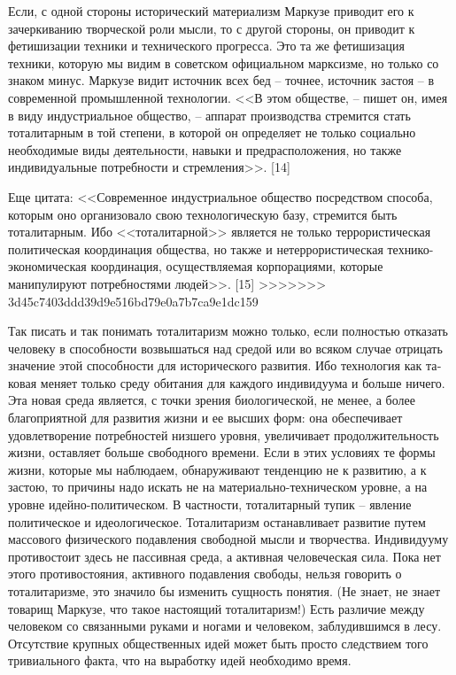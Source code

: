\documentclass{book}
\begin{document}
{Если, с одной стороны исторический материализм Маркузе приводит его к зачеркиванию творческой роли мысли, то с дру­гой стороны, он приводит к фетишизации техники и техниче­ского прогресса. Это та же фетишизация техники, которую мы видим в советском официальном марксизме, но только со знаком минус. Маркузе видит источник всех бед -- точнее, источник застоя -- в современной промышленной технологии. <<В этом обществе, -- пишет он, имея в виду индустриальное общество, -- аппарат производства стремится стать тоталитар­ным в той степени, в которой он определяет не только соци­ально необходимые виды деятельности, навыки и предрасполо­жения, но также индивидуальные потребности и стремления>>. [14]

Еще цитата: <<Современное индустриальное общество посред­ством способа, которым оно организовало свою технологиче­скую базу, стремится быть тоталитарным. Ибо <<тоталитарной>> является не только террористическая политическая коорди­нация общества, но также и нетеррористическая технико-эко­номическая координация, осуществляемая корпорациями, кото­рые манипулируют потребностями людей>>. [15]
>>>>>>> 3d45c7403ddd39d9e516bd79e0a7b7ca9e1dc159

Так писать и так понимать тоталитаризм можно только, ес­ли полностью отказать человеку в способности возвышаться над средой или во всяком случае отрицать значение этой спо­собности для исторического развития. Ибо технология как та­ковая меняет только среду обитания  для каждого индивиду­ума и больше ничего. Эта новая среда является, с точки зрения биологической, не менее, а более благоприятной для развития жизни и ее высших форм: она обеспечивает удовлетворение потребностей низшего уровня, увеличивает продолжительность жизни, оставляет больше свободного времени. Если в этих ус­ловиях те формы жизни, которые мы наблюдаем, обнаружи­вают тенденцию не к развитию, а к застою, то причины надо ис­кать не на материально-техническом уровне, а на уровне идей­но-политическом. В частности, тоталитарный тупик -- явление политическое и идеологическое. Тоталитаризм останавливает развитие путем массового физического подавления свободной мысли и творчества. Индивидууму противостоит здесь не пассив­ная среда, а активная 
человеческая сила. Пока нет этого проти­востояния, активного подавления свободы, нельзя говорить о тоталитаризме, это значило бы изменить сущность понятия. (Не знает, не знает товарищ Маркузе, что такое настоящий то­талитаризм!) Есть различие между человеком со связанными руками и ногами и человеком, заблудившимся в лесу. Отсутст­вие крупных общественных идей может быть просто следстви­ем того тривиального факта, что на выработку идей необхо­димо время. 

}
\end{document}
